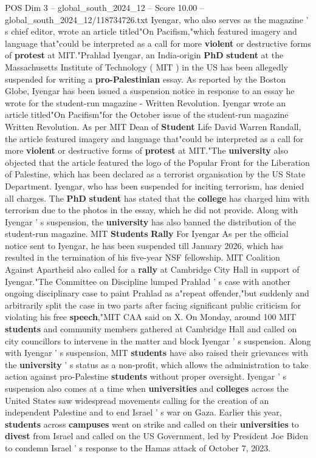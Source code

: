 \begin{textsample}{POS Dim 3 – global\_south\_2024\_12 – Score 10.00 – global\_south\_2024\_12/118734726.txt}  \label{ex:f3_pos_388}
Iyengar, who also serves as the magazine ' s chief editor, wrote an article titled"On Pacifism,"which featured imagery and language that"could be interpreted as a call for more \textbf{violent} or destructive forms of \textbf{protest} at MIT."Prahlad Iyengar, an India-origin \textbf{PhD} \textbf{student} at the Massachusetts Institute of Technology ( MIT ) in the US has been allegedly suspended for writing a \textbf{pro-Palestinian} essay.
As reported by the Boston Globe, Iyengar has been issued a suspension notice in response to an essay he wrote for the student-run magazine - Written Revolution.
Iyengar wrote an article titled"On Pacifism"for the October issue of the student-run magazine Written Revolution.
As per MIT Dean of \textbf{Student} Life David Warren Randall, the article featured imagery and language that"could be interpreted as a call for more \textbf{violent} or destructive forms of \textbf{protest} at MIT."The \textbf{university} also objected that the article featured the logo of the Popular Front for the Liberation of Palestine, which has been declared as a terrorist organisation by the US State Department.
Iyengar, who has been suspended for inciting terrorism, has denied all charges.
The \textbf{PhD} \textbf{student} has stated that the \textbf{college} has charged him with terrorism due to the photos in the essay, which he did not provide.
Along with Iyengar ' s suspension, the \textbf{university} has also banned the distribution of the student-run magazine.
MIT \textbf{Students} \textbf{Rally} For Iyengar As per the official notice sent to Iyengar, he has been suspended till January 2026, which has resulted in the termination of his five-year NSF fellowship.
MIT Coalition Against Apartheid also called for a \textbf{rally} at Cambridge City Hall in support of Iyengar."The Committee on Discipline lumped Prahlad ' s case with another ongoing disciplinary case to paint Prahlad as a"repeat offender,"but suddenly and arbitrarily split the case in two parts after facing significant public criticism for violating his free \textbf{speech},"MIT CAA said on X.
On Monday, around 100 MIT \textbf{students} and community members gathered at Cambridge Hall and called on city councillors to intervene in the matter and block Iyengar ' s suspension.
Along with Iyengar ' s suspension, MIT \textbf{students} have also raised their grievances with the \textbf{university} ' s status as a non-profit, which allows the administration to take action against pro-Palestine \textbf{students} without proper oversight.
Iyengar ' s suspension also comes at a time when \textbf{universities} and \textbf{colleges} across the United States saw widespread movements calling for the creation of an independent Palestine and to end Israel ' s war on Gaza.
Earlier this year, \textbf{students} across \textbf{campuses} went on strike and called on their \textbf{universities} to \textbf{divest} from Israel and called on the US Government, led by President Joe Biden to condemn Israel ' s response to the Hamas attack of October 7, 2023.

\end{textsample}

